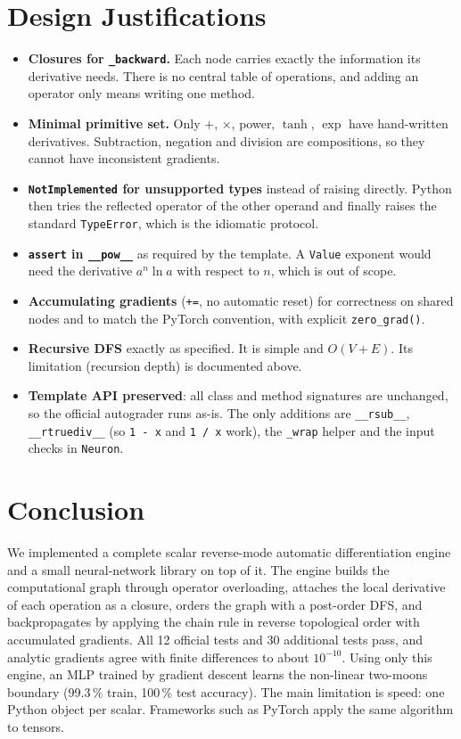 \documentclass[11pt,a4paper]{article}
\begin{document}
\section{Design Justifications}
\begin{itemize}
  \item \textbf{Closures for \texttt{\_backward}.} Each node carries exactly the information its derivative needs.
        There is no central table of operations, and adding an operator only means writing one method.
  \item \textbf{Minimal primitive set.} Only $+$, $\times$, power, $\tanh$, $\exp$ have hand-written derivatives.
        Subtraction, negation and division are compositions, so they cannot have inconsistent gradients.
  \item \textbf{\texttt{NotImplemented} for unsupported types} instead of raising directly. Python then tries the reflected
        operator of the other operand and finally raises the standard \texttt{TypeError}, which is the idiomatic protocol.
  \item \textbf{\texttt{assert} in \texttt{\_\_pow\_\_}} as required by the template. A \texttt{Value} exponent would need the
        derivative $a^n\ln a$ with respect to $n$, which is out of scope.
  \item \textbf{Accumulating gradients} (\texttt{+=}, no automatic reset) for correctness on shared nodes and to match the
        PyTorch convention, with explicit \texttt{zero\_grad()}.
  \item \textbf{Recursive DFS} exactly as specified. It is simple and $O(V+E)$. Its limitation (recursion depth) is documented above.
  \item \textbf{Template API preserved}: all class and method signatures are unchanged, so the official autograder runs as-is.
        The only additions are \texttt{\_\_rsub\_\_}, \texttt{\_\_rtruediv\_\_} (so \texttt{1 - x} and \texttt{1 / x} work),
        the \texttt{\_wrap} helper and the input checks in \texttt{Neuron}.
\end{itemize}

\section{Conclusion}
We implemented a complete scalar reverse-mode automatic differentiation engine and a small neural-network
library on top of it. The engine builds the computational graph through operator overloading, attaches the
local derivative of each operation as a closure, orders the graph with a post-order DFS, and backpropagates
by applying the chain rule in reverse topological order with accumulated gradients. All 12 official tests
and 30 additional tests pass, and analytic gradients agree with finite differences to about $10^{-10}$.
Using only this engine, an MLP trained by gradient descent learns the non-linear two-moons boundary
(99.3\,\% train, 100\,\% test accuracy). The main limitation is speed: one Python object per scalar.
Frameworks such as PyTorch apply the same algorithm to tensors.
\end{document}
